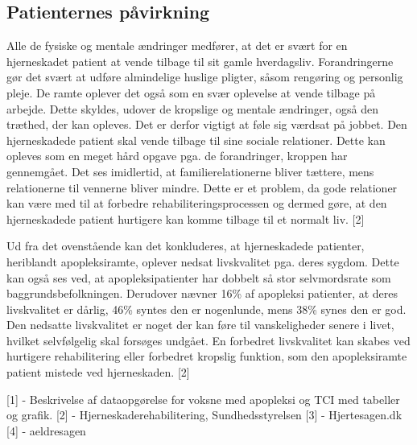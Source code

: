\subsection{Patienternes påvirkning}
Alle de fysiske og mentale ændringer medfører, at det er svært for en hjerneskadet patient at vende tilbage til sit gamle hverdagsliv. Forandringerne gør det svært at udføre almindelige huslige pligter, såsom rengøring og personlig pleje. De ramte oplever det også som en svær oplevelse at vende tilbage på arbejde. Dette skyldes, udover de kropslige og mentale ændringer, også den træthed, der kan opleves. Det er derfor vigtigt at føle sig værdsat på jobbet. Den hjerneskadede patient skal vende tilbage til sine sociale relationer. Dette kan opleves som en meget hård opgave pga. de forandringer, kroppen har gennemgået. Det ses imidlertid, at familierelationerne bliver tættere, mens relationerne til vennerne bliver mindre. Dette er et problem, da gode relationer kan være med til at forbedre rehabiliteringsprocessen og dermed gøre, at den hjerneskadede patient hurtigere kan komme tilbage til et normalt liv. [2]

Ud fra  det ovenstående kan det konkluderes, at hjerneskadede patienter, heriblandt apopleksiramte, oplever nedsat livskvalitet pga. deres sygdom. Dette kan også ses ved, at apopleksipatienter har dobbelt så stor selvmordsrate som baggrundsbefolkningen. Derudover nævner 16\% af apopleksi patienter, at deres livskvalitet er dårlig, 46\% syntes den er nogenlunde, mens 38\% synes den er god. Den nedsatte livskvalitet er noget der kan føre til vanskeligheder senere i livet, hvilket selvfølgelig skal forsøges undgået. En forbedret livskvalitet kan skabes ved hurtigere rehabilitering eller forbedret kropslig funktion, som den apopleksiramte patient mistede ved hjerneskaden. [2]  


[1] - Beskrivelse af dataopgørelse for voksne med apopleksi og TCI med tabeller og grafik. 
[2] - Hjerneskaderehabilitering, Sundhedsstyrelsen
[3] - Hjertesagen.dk
[4] - aeldresagen

